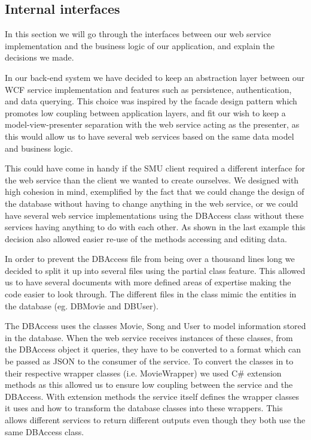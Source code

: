 \subsection{Internal interfaces}
In this section we will go through the interfaces between our web service
implementation and the business logic of our application, and explain the
decisions we made.

In our back-end system we have decided to keep an abstraction layer between our WCF service implementation and features such as persistence, authentication, and data querying. This choice was inspired by the facade design pattern which promotes low coupling between application layers, and fit our wish to keep a model-view-presenter separation with the web service acting as the presenter, as this would allow us to have several web services based on the same data model and business logic.

This could have come in handy if the SMU client required a different interface
for the web service than the client we wanted to create ourselves. We designed
with high cohesion in mind, exemplified by the fact that we could change the
design of the database without having to change anything in the web service, or
we could have several web service implementations using the DBAccess class
without these services having anything to do with each other. As shown in the
last example this decision also allowed easier re-use of the methods accessing
and editing data.

In order to prevent the DBAccess file from being over a thousand lines long we
decided to split it up into several files using the partial class feature. This
allowed us to have several documents with more defined areas of expertise
making the code easier to look through. The different files in the class mimic
the entities in the database (eg. DBMovie and DBUser).

The DBAccess uses the classes Movie, Song and User to model information stored
in the database. When the web service receives instances of these classes, from
the DBAccess object it queries, they have to be converted to a format which can
be passed as JSON to the consumer of the service. To convert the classes in to
their respective wrapper classes (i.e. MovieWrapper) we used C\# extension methods
as this allowed us to ensure low coupling between the service and the DBAccess.
With extension methods the service itself defines the wrapper classes it uses
and how to transform the database classes into these wrappers. This allows
different services to return different outputs even though they both use the
same DBAccess class.

